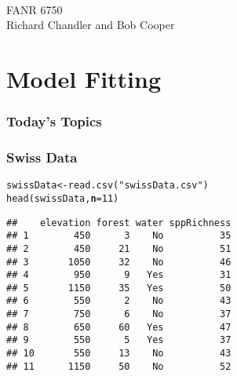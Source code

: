 \documentclass[color=usenames,dvipsnames]{beamer}\usepackage[]{graphicx}\usepackage[]{color}
\makeatletter
\newcommand{\hlnum}[1]{\textcolor[rgb]{0.69,0.494,0}{#1}}%
\newcommand{\hlstr}[1]{\textcolor[rgb]{0.749,0.012,0.012}{#1}}%
\newcommand{\hlstd}[1]{\textcolor[rgb]{0,0,0}{#1}}%
\newcommand{\hlkwb}[1]{\textcolor[rgb]{0,0.341,0.682}{#1}}%
\newcommand{\hlkwc}[1]{\textcolor[rgb]{0,0,0}{\textbf{#1}}}%
\newcommand{\hlkwd}[1]{\textcolor[rgb]{0.004,0.004,0.506}{#1}}%
\newenvironment{kframe}{%
 \def\at@end@of@kframe{}%
 \ifinner\ifhmode%
  \def\at@end@of@kframe{\end{minipage}}%
  \begin{minipage}{\columnwidth}%
 \fi\fi%
 \def\FrameCommand##1{\hskip\@totalleftmargin \hskip-\fboxsep
 \colorbox{shadecolor}{##1}\hskip-\fboxsep
     \hskip-\linewidth \hskip-\@totalleftmargin \hskip\columnwidth}%
 \MakeFramed {\advance\hsize-\width
   \@totalleftmargin\z@ \linewidth\hsize
   \@setminipage}}%
 {\par\unskip\endMakeFramed%
 \at@end@of@kframe}
\newenvironment{knitrout}{}{} %
\makeatother
\begin{document}



\begin{frame}[plain]
  \centering \huge
  {\color{RoyalBlue}{Lab 14 -- Model Selection and Multimodel Inference}} \\
  \vspace{1cm}
  \LARGE
  FANR 6750 \\
  \vfill
  \large
  Richard Chandler and Bob Cooper
\end{frame}




\section{Model Fitting}



\begin{frame}[plain]
  \frametitle{Today's Topics}
  \LARGE
\end{frame}




\begin{frame}[fragile]
  \frametitle{Swiss Data}
\begin{knitrout}\small
{}\color{fgcolor}\begin{kframe}
\begin{alltt}
\hlstd{swissData} \hlkwb{<-} \hlkwd{read.csv}\hlstd{(}\hlstr{"swissData.csv"}\hlstd{)}
\hlkwd{head}\hlstd{(swissData,} \hlkwc{n}\hlstd{=}\hlnum{11}\hlstd{)}
\end{alltt}
\begin{verbatim}
##    elevation forest water sppRichness
## 1        450      3    No          35
## 2        450     21    No          51
## 3       1050     32    No          46
## 4        950      9   Yes          31
## 5       1150     35   Yes          50
## 6        550      2    No          43
## 7        750      6    No          37
## 8        650     60   Yes          47
## 9        550      5   Yes          37
## 10       550     13    No          43
## 11      1150     50    No          52
\end{verbatim}
\end{kframe}
\end{knitrout}
\end{frame}
\end{document}
